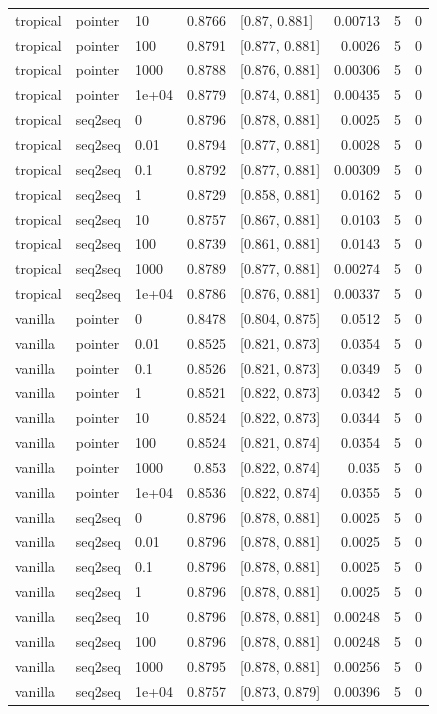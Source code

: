 \documentclass[10pt]{article}
\begin{document}
{\begin{longtable}{lllrlrrr}
tropical & pointer & 10 & 0.8766 & [0.87, 0.881] & 0.00713 & 5 & 0\\
tropical & pointer & 100 & 0.8791 & [0.877, 0.881] & 0.0026 & 5 & 0\\
tropical & pointer & 1000 & 0.8788 & [0.876, 0.881] & 0.00306 & 5 & 0\\
tropical & pointer & 1e+04 & 0.8779 & [0.874, 0.881] & 0.00435 & 5 & 0\\
tropical & seq2seq & 0 & 0.8796 & [0.878, 0.881] & 0.0025 & 5 & 0\\
tropical & seq2seq & 0.01 & 0.8794 & [0.877, 0.881] & 0.0028 & 5 & 0\\
tropical & seq2seq & 0.1 & 0.8792 & [0.877, 0.881] & 0.00309 & 5 & 0\\
tropical & seq2seq & 1 & 0.8729 & [0.858, 0.881] & 0.0162 & 5 & 0\\
tropical & seq2seq & 10 & 0.8757 & [0.867, 0.881] & 0.0103 & 5 & 0\\
tropical & seq2seq & 100 & 0.8739 & [0.861, 0.881] & 0.0143 & 5 & 0\\
tropical & seq2seq & 1000 & 0.8789 & [0.877, 0.881] & 0.00274 & 5 & 0\\
tropical & seq2seq & 1e+04 & 0.8786 & [0.876, 0.881] & 0.00337 & 5 & 0\\
vanilla & pointer & 0 & 0.8478 & [0.804, 0.875] & 0.0512 & 5 & 0\\
vanilla & pointer & 0.01 & 0.8525 & [0.821, 0.873] & 0.0354 & 5 & 0\\
vanilla & pointer & 0.1 & 0.8526 & [0.821, 0.873] & 0.0349 & 5 & 0\\
vanilla & pointer & 1 & 0.8521 & [0.822, 0.873] & 0.0342 & 5 & 0\\
vanilla & pointer & 10 & 0.8524 & [0.822, 0.873] & 0.0344 & 5 & 0\\
vanilla & pointer & 100 & 0.8524 & [0.821, 0.874] & 0.0354 & 5 & 0\\
vanilla & pointer & 1000 & 0.853 & [0.822, 0.874] & 0.035 & 5 & 0\\
vanilla & pointer & 1e+04 & 0.8536 & [0.822, 0.874] & 0.0355 & 5 & 0\\
vanilla & seq2seq & 0 & 0.8796 & [0.878, 0.881] & 0.0025 & 5 & 0\\
vanilla & seq2seq & 0.01 & 0.8796 & [0.878, 0.881] & 0.0025 & 5 & 0\\
vanilla & seq2seq & 0.1 & 0.8796 & [0.878, 0.881] & 0.0025 & 5 & 0\\
vanilla & seq2seq & 1 & 0.8796 & [0.878, 0.881] & 0.0025 & 5 & 0\\
vanilla & seq2seq & 10 & 0.8796 & [0.878, 0.881] & 0.00248 & 5 & 0\\
vanilla & seq2seq & 100 & 0.8796 & [0.878, 0.881] & 0.00248 & 5 & 0\\
vanilla & seq2seq & 1000 & 0.8795 & [0.878, 0.881] & 0.00256 & 5 & 0\\
vanilla & seq2seq & 1e+04 & 0.8757 & [0.873, 0.879] & 0.00396 & 5 & 0\\
\bottomrule
\end{longtable}
}
\end{document}
